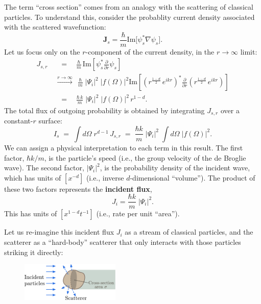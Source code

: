 \documentclass[pra,12pt]{revtex4}
\begin{document}
The term ``cross section'' comes from an analogy with the scattering
of classical particles.  To understand this, consider the probablity
current density associated with the scattered wavefunction:
\begin{equation}
  \mathbf{J}_s = \frac{\hbar}{m} \mathrm{Im}\big[\psi_s^*\nabla\psi_s\big].
\end{equation}
Let us focus only on the $r$-component of the current density, in the
$r\rightarrow\infty$ limit:
\begin{equation}
  \begin{aligned}J_{s,r}\; &\;\;=\;\;\;\, \frac{\hbar}{m}\, \mathrm{Im}\left[\psi_s^* \frac{\partial}{\partial r}\psi_s\right] \\ &\overset{r\rightarrow\infty}{\longrightarrow}\;\, \frac{\hbar}{m}\; |\Psi_i|^2 \; |f(\Omega)|^2 \mathrm{Im}\left[\left(r^{\frac{1-d}{2}} \, e^{ikr}\right)^* \frac{\partial}{\partial r} \left(r^{\frac{1-d}{2}} \, e^{ikr}\right)\right] \\ & \;\;=\;\;\;\, \frac{\hbar \,k}{m}\; |\Psi_i|^2 \; |f(\Omega)|^2 \,r^{1-d}.\end{aligned}
\end{equation}
The total flux of outgoing probability is obtained by integrating
$J_{s,r}$ over a constant-$r$ surface:
\begin{equation}
  I_s \;=\; \int d\Omega\; r^{d-1} \, J_{s,r} \;=\; \frac{\hbar k}{m} \;|\Psi_i|^2 \; \int d\Omega\; \big|f(\Omega)\big|^2.
\end{equation}
We can assign a physical interpretation to each term in this
result.  The first factor, $\hbar k/m$, is the
particle's speed (i.e., the group velocity of the de Broglie wave).
The second factor, $|\Psi_i|^2$, is the probability density of the incident
wave, which has units of $[x^{-d}]$ (i.e., inverse $d$-dimensional
``volume'').  The product of these two factors represents the
\textbf{incident flux},
\begin{equation}
  J_{i} = \frac{\hbar k}{m} \;|\Psi_i|^2.
\end{equation}
This has units of $[x^{1-d}t^{-1}]$ (i.e., rate per unit ``area'').

Let us re-imagine this incident flux $J_i$ as a stream of classical
particles, and the scatterer as a ``hard-body'' scatterer that only
interacts with those particles striking it directly:

\begin{figure}[h]
  \centering\includegraphics[width=0.42\textwidth]{crosssection}
\end{figure}
\end{document}
